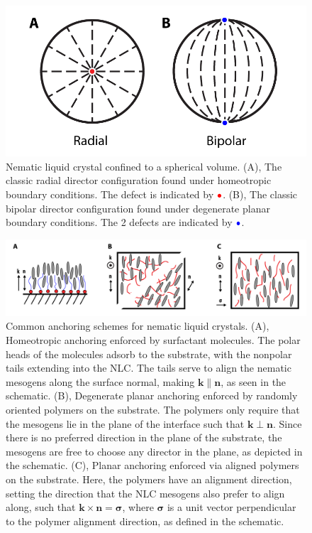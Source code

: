 \begin{figure}
  \centering
  \includegraphics{figures/C2/Ch2-Figs_DropSchem.png}
  \caption{Nematic liquid crystal confined to a spherical volume.
  (A), The classic radial director configuration found under homeotropic boundary conditions.
  The defect is indicated by ${\color{red} \bullet}$.
  (B), The classic bipolar director configuration found under degenerate planar boundary conditions.
  The 2 defects are indicated by ${\color{blue} \bullet}$.}\label{f:2-DropSchem}
\end{figure}

\begin{figure}[h]
  \centering
  \includegraphics{figures/C2/Ch2-Figs_Anchor.png}
  \caption{Common anchoring schemes for nematic liquid crystals. (A), Homeotropic anchoring enforced by surfactant molecules.
  The polar heads of the molecules adsorb to the substrate, with the nonpolar tails extending into the NLC.
  The tails serve to align the nematic mesogens along the surface normal, making $\mathbf{k} \parallel \mathbf{n}$, as seen in the schematic.
  (B), Degenerate planar anchoring enforced by randomly oriented polymers on the substrate. The polymers only require that the mesogens lie in the plane of the interface such that $\mathbf{k} \perp \mathbf{n}$. Since there is no preferred direction in the plane of the substrate, the mesogens are free to choose any director in the plane, as depicted in the schematic.
  (C), Planar anchoring enforced via aligned polymers on the substrate. Here, the polymers have an alignment direction, setting the direction that the NLC mesogens also prefer to align along, such that $\mathbf{k} \times \mathbf{n} = \bm{\sigma}$, where $\bm{\sigma}$ is a unit vector perpendicular to the polymer alignment direction, as defined in the schematic.}\label{f:2-Anchor}
\end{figure}

